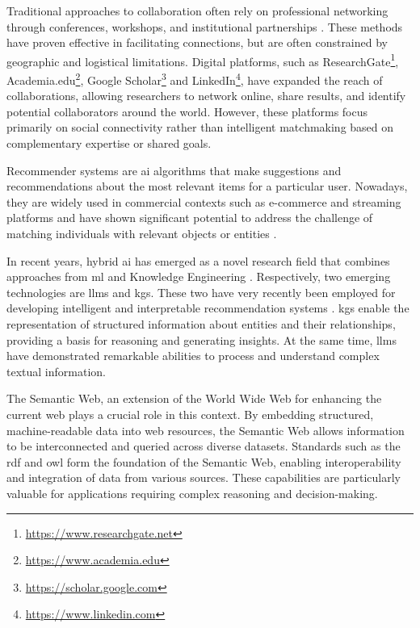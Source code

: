 Traditional approaches to collaboration often rely on professional networking through conferences, workshops, and institutional partnerships \cite{KATZ19971}.
These methods have proven effective in facilitating connections, but are often constrained by geographic and logistical limitations.
Digital platforms, such as ResearchGate\footnote{\url{https://www.researchgate.net}}, Academia.edu\footnote{\url{https://www.academia.edu}}, Google Scholar\footnote{\url{https://scholar.google.com}} and LinkedIn\footnote{\url{https://www.linkedin.com}}, have expanded the reach of collaborations, allowing researchers to network online, share results, and identify potential collaborators around the world.
However, these platforms focus primarily on social connectivity rather than intelligent matchmaking based on complementary expertise or shared goals.

Recommender systems \cite{Lu2012} are \gls{ai} algorithms that make suggestions and recommendations about the most relevant items for a particular user.
Nowadays, they are widely used in commercial contexts such as e-commerce and streaming platforms and have shown significant potential to address the challenge of matching individuals with relevant objects or entities \cite{Hussien2021}.

In recent years, hybrid \gls{ai} has emerged as a novel research field that combines approaches from \gls{ml} and Knowledge Engineering \cite{RordorfKCL23,PraterLaurenzi22,GarcezL23}.
Respectively, two emerging technologies are \glspl{llm} and \glspl{kg}.
These two have very recently been employed for developing intelligent and interpretable recommendation systems \cite{Zhao2024}.
\glspl{kg} enable the representation of structured information about entities and their relationships, providing a basis for reasoning and generating insights.
At the same time, \glspl{llm} have demonstrated remarkable abilities to process and understand complex textual information. 

The Semantic Web, an extension of the World Wide Web for enhancing the current web plays a crucial role in this context.
By embedding structured, machine-readable data into web resources, the Semantic Web allows information to be interconnected and queried across diverse datasets.
Standards such as the \gls{rdf} \cite{Cyganiak14RCA} and \gls{owl} \cite{Deborah2004} form the foundation of the Semantic Web, enabling interoperability and integration of data from various sources.
These capabilities are particularly valuable for applications requiring complex reasoning and decision-making.


